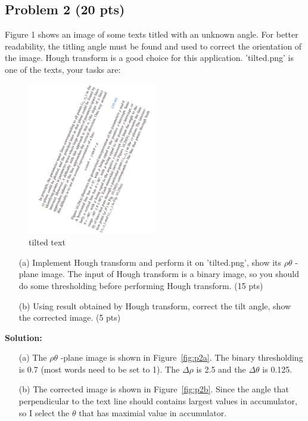 \documentclass[11pt,letterpaper]{article}
\begin{document}
\subsection*{Problem 2 (20 pts) }

Figure 1 shows an image of some texts titled with an unknown angle. For better readability, the titling angle must be found and used to correct the orientation of the image. Hough transform is a good choice for this application. ’tilted.png’ is one of the texts, your tasks are:
\begin{figure}[H]
	\centering 
	\includegraphics[width=0.5\textwidth]{tilted.PNG}
	\caption{tilted text}
	\label{Figure1}
\end{figure}
\begin{itemize}
\item[(a)] Implement Hough transform and perform it on ’tilted.png’, show its $\rho \theta$ -plane image. The input of Hough transform is a binary image, so you should do some thresholding before performing Hough transform. (15 pts)

\item[(b)] Using result obtained by Hough transform, correct the tilt angle, show the corrected image. (5 pts)

\end{itemize}
\textbf{Solution:}
\begin{itemize}
	\item [(a)] The $\rho \theta$ -plane image is shown in Figure~\ref{fig:p2a}. The binary thresholding is 0.7 (most words need to be set to 1).
				The $\Delta\rho$ is 2.5 and the  $\Delta\theta$ is 0.125. 
	\item [(b)] The corrected image is shown in Figure~\ref{fig:p2b}. Since the angle that perpendicular to the text line should contains largest values in accumulator,
				so I select the $\theta$ that has maximial value in accumulator.
\end{itemize}
\end{document}
